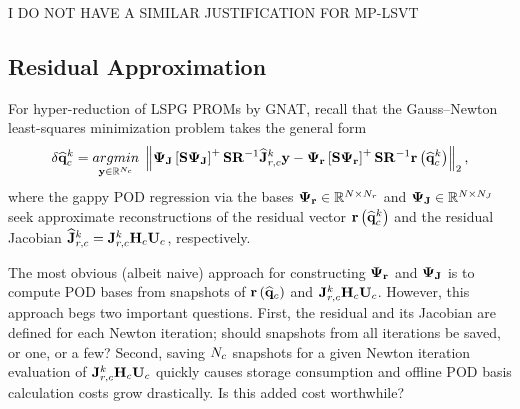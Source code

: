 {\color{red} I DO NOT HAVE A SIMILAR JUSTIFICATION FOR MP-LSVT}

\subsection{Residual Approximation}
%
For hyper-reduction of LSPG PROMs by GNAT, recall that the Gauss--Newton least-squares minimization problem takes the general form
%
\begin{equation}
    \delta \consVecCoef^{\newtonIdx} = \argmin{\dummyVec \inROne{\numConsModes}} \left\Vert \deimBasisJacob \left[ \sampMat \deimBasisJacob \right]^{+} \sampMat \resScaleInv \jacobResCoefCons^{\newtonIdx} \dummyVec - \deimBasisRes \left[ \sampMat \deimBasisRes \right]^{+} \sampMat \resScaleInv \resFunc{\consVecCoef^{\newtonIdx}} \right\Vert_2,
\end{equation}
%
where the gappy POD regression via the bases $\deimBasisRes \inRTwo{\numDOF}{\numResModes}$ and $\deimBasisJacob \inRTwo{\numDOF}{\numJacobModes}$ seek approximate reconstructions of the residual vector $\mathbf{r}\left(\mathbf{\widehat{q}}_{c}^{k}\right)$ and the residual Jacobian $\jacobResCoefCons^{\newtonIdx} = \jacobResCons^{\newtonIdx} \consScale \consTrial$, respectively.

The most obvious (albeit naive) approach for constructing $\deimBasisRes$ and $\deimBasisJacob$ is to compute POD bases from snapshots of $\mathbf{r}\left(\mathbf{\widehat{q}}_{c}\right)$ and $\jacobResCons^{\newtonIdx} \consScale \consTrial$. However, this approach begs two important questions. First, the residual and its Jacobian are defined for each Newton iteration; should snapshots from all iterations be saved, or one, or a few? Second, saving $N_c$ snapshots for a given Newton iteration evaluation of $\jacobResCons^{\newtonIdx} \consScale \consTrial$ quickly causes storage consumption and offline POD basis calculation costs grow drastically. Is this added cost worthwhile?

